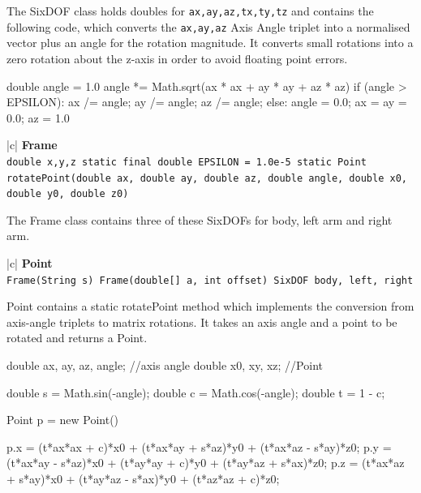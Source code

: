 \documentclass[12pt,a4,notitlepage]{report}
\renewcommand{\_}{\texttt{\symbol{95}}}
\newcommand{\<}{\texttt{\symbol{60}}}
\renewcommand{\>}{\texttt{\symbol{62}}}
\newcommand{\class}[1]{\textbf{#1}}
\newcommand{\variable}[1]{\texttt{#1}}
\begin{document}
The SixDOF class holds doubles for \variable{ax,ay,az,tx,ty,tz} and contains the following code, which converts the \variable{ax,ay,az} Axis Angle triplet into a normalised vector plus an angle for the rotation magnitude. It converts small rotations into a zero rotation about the z-axis in order to avoid floating point errors.

\begin{code}
double angle = 1.0
angle *= Math.sqrt(ax * ax + ay * ay + az * az)
if (angle > EPSILON):
    ax /= angle;
    ay /= angle;
    az /= angle;
else:
    angle = 0.0;
    ax = ay = 0.0;
    az = 1.0
\end{code}

\begin{tabular}{|c|} \hline 
\class{Frame} \\ \hline
{}
{\variable{double x,y,z \newline
  static final double EPSILON = 1.0e-5 \newline
  static Point rotatePoint(double ax, double ay, double az, double angle, double x0, double y0, double z0)
} } \\ \hline
\end{tabular}

The Frame class contains three of these SixDOFs for body, left arm and right arm.

\begin{tabular}{|c|} \hline 
\class{Point} \\ \hline
{}
{\variable{Frame(String s) \newline
  Frame(double[] a, int offset)\newline
  SixDOF body, left, right 
} } \\ \hline
\end{tabular}

Point contains a static rotatePoint method which implements the conversion from axis-angle triplets to matrix rotations. It takes an axis angle and a point to be rotated and returns a Point.

\begin{code}
double ax, ay, az, angle; //axis angle
double x0, xy, xz; //Point

double s = Math.sin(-angle);
double c = Math.cos(-angle);
double t = 1 - c;

Point p = new Point()

p.x = (t*ax*ax + c)*x0 + (t*ax*ay + s*az)*y0 + (t*ax*az - s*ay)*z0;
p.y = (t*ax*ay - s*az)*x0 + (t*ay*ay + c)*y0 + (t*ay*az + s*ax)*z0;
p.z = (t*ax*az + s*ay)*x0 + (t*ay*az - s*ax)*y0 + (t*az*az + c)*z0;
\end{code}
\end{document}
